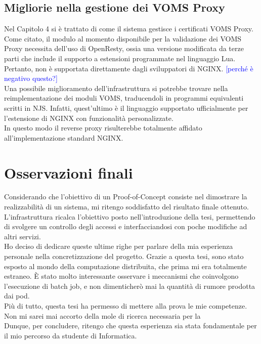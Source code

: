 \subsection{Migliorie nella gestione dei VOMS Proxy}
Nel Capitolo 4 si è trattato di come il sistema gestisce i certificati VOMS Proxy. 
Come citato, il modulo al momento disponibile per la validazione dei VOMS Proxy necessita dell'uso di OpenResty, 
ossia una versione modificata da terze 
parti che include il supporto a estensioni programmate nel linguaggio Lua. Pertanto, non è supportata direttamente dagli sviluppatori di NGINX. 
\textcolor{blue}{[perché è negativo questo?]}
\\  Una possibile miglioramento dell'infrastruttura si potrebbe trovare nella reimplementazione dei moduli VOMS, 
traducendoli in programmi equivalenti scritti in NJS. Infatti, quest'ultimo è il linguaggio supportato ufficialmente per 
l'estensione di NGINX con funzionalità personalizzate.  
\\ In questo modo il reverse proxy 
risulterebbe totalmente affidato all'implementazione standard NGINX.

\section{Osservazioni finali}
Considerando che l'obiettivo di un Proof-of-Concept consiste nel dimostrare la realizzabilità 
di un sistema, mi ritengo soddisfatto del risultato finale ottenuto. L'infrastruttura ricalca l'obiettivo 
posto nell'introduzione della tesi, permettendo di svolgere un controllo degli accessi e interfacciandosi 
con poche modifiche ad altri servizi.  
\\ Ho deciso di dedicare queste ultime righe per parlare della mia esperienza personale nella concretizzazione del progetto. 
Grazie a questa tesi, sono stato esposto al mondo della computazione distribuita, che prima mi era totalmente estraneo. 
È stato molto interessante osservare i meccanismi che coinvolgono l'esecuzione di batch job, e non dimenticherò mai 
la quantità di rumore prodotta dai pod.   
\\ Più di tutto, questa tesi ha permesso di mettere alla prova le mie competenze. 
Non mi sarei mai accorto della mole di ricerca necessaria per la 
\\ Dunque, per concludere, ritengo che questa esperienza sia stata fondamentale per il mio percorso da studente di Informatica.  